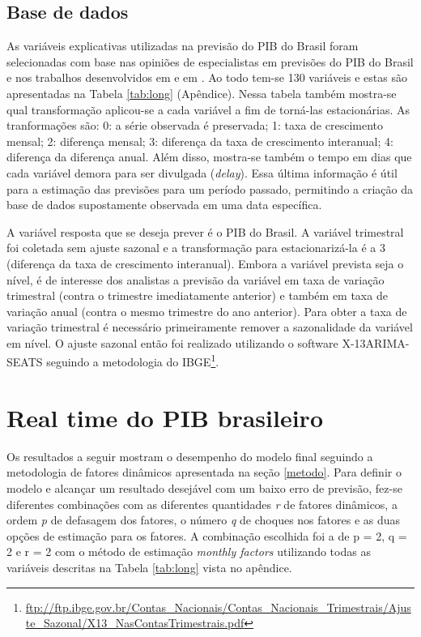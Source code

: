 \documentclass{article}
\begin{document}
\subsection{Base de dados}\label{base}

As variáveis explicativas utilizadas na previsão do PIB do Brasil foram selecionadas com base nas opiniões de especialistas em previsões do PIB do Brasil e nos trabalhos desenvolvidos em \cite{giannoneetal2008} e em \cite{banburaetal2011}. Ao todo tem-se 130 variáveis e estas são apresentadas na Tabela \ref{tab:long} (Apêndice). Nessa tabela também mostra-se qual transformação aplicou-se a cada variável a fim de torná-las estacionárias. As tranformações são: 0: a série observada é preservada; 1: taxa de crescimento mensal; 2: diferença mensal; 3: diferença da taxa de crescimento interanual; 4: diferença da diferença anual. Além disso, mostra-se também o tempo em dias que cada variável demora para ser divulgada (\textit{delay}). Essa última informação é útil para a estimação das previsões para um período passado, permitindo a criação da base de dados supostamente observada em uma data específica.

A variável resposta que se deseja prever é o PIB do Brasil. A variável trimestral foi coletada sem ajuste sazonal e a transformação para estacionarizá-la é a 3 (diferença da taxa de crescimento interanual). Embora a variável prevista seja o nível, é de interesse dos analistas a previsão da variável em taxa de variação trimestral (contra o trimestre imediatamente anterior) e também em taxa de variação anual (contra o mesmo trimestre do ano anterior). Para obter a taxa de variação trimestral é necessário primeiramente remover a sazonalidade da variável em nível. O ajuste sazonal então foi realizado utilizando o software X-13ARIMA-SEATS seguindo a metodologia do IBGE\footnote{\url{ftp://ftp.ibge.gov.br/Contas_Nacionais/Contas_Nacionais_Trimestrais/Ajuste_Sazonal/X13_NasContasTrimestrais.pdf}}.  


\section{Real time do PIB brasileiro}\label{nowcastingBR}

Os resultados a seguir mostram o desempenho do modelo final seguindo a metodologia de fatores dinâmicos apresentada na seção \ref{metodo}. Para definir o modelo e alcançar um resultado desejável com um baixo erro de previsão, fez-se diferentes combinações com as diferentes quantidades \textit{r} de fatores dinâmicos, a ordem \textit{p} de defasagem dos fatores, o número \textit{q} de choques nos fatores e as duas opções de estimação para os fatores. A combinação escolhida foi a de p = 2, q = 2 e r = 2 com o método de estimação \textit{monthly factors} utilizando todas as variáveis descritas na Tabela \ref{tab:long} vista no apêndice.
\end{document}
